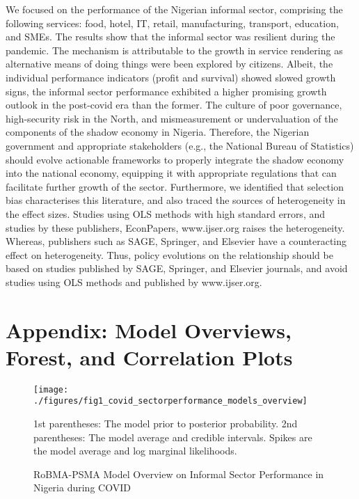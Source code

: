 \documentclass[12pt, english]{article}
\begin{document}
    We focused on the performance of the Nigerian informal sector, comprising the following services: food, hotel, IT, retail, manufacturing, transport, education, and SMEs. The results show that the informal sector was resilient during the pandemic. The mechanism is attributable to the growth in service rendering as alternative means of doing things were been explored by citizens. Albeit, the individual performance indicators (profit and survival) showed slowed growth signs, the informal sector performance exhibited a higher promising growth outlook in the post-covid era than the former. The culture of poor governance, high-security risk in the North, and mismeasurement or undervaluation of the components of the shadow economy in Nigeria. Therefore, the Nigerian government and appropriate stakeholders (e.g., the National Bureau of Statistics) should evolve actionable frameworks to properly integrate the shadow economy into the national economy, equipping it with appropriate regulations that can facilitate further growth of the sector. Furthermore, we identified that selection bias characterises this literature, and also traced the sources of heterogeneity in the effect sizes. Studies using OLS methods with high standard errors, and studies by these publishers, EconPapers, www.ijser.org raises the heterogeneity. Whereas, publishers such as SAGE, Springer, and Elsevier have a counteracting effect on heterogeneity. Thus, policy evolutions on the relationship should be based on studies published by SAGE, Springer, and Elsevier journals, and avoid studies using OLS methods and published by www.ijser.org.

    \newpage
    \printbibliography


    \section{Appendix: Model Overviews, Forest, and Correlation Plots}\label{appendixA}

    \begin{figure}[H]
        \centering
        \texttt{[image: ./figures/fig1\_covid\_sectorperformance\_models\_overview]}
        \caption{RoBMA-PSMA Model Overview on Informal Sector Performance in Nigeria during COVID}
        \label{fig14:robma-psma-model-overview-covid}
        \begin{minipage}{10cm}
            \vspace{0.1cm}
            \small 1st parentheses: The model prior to posterior probability. 2nd parentheses: The model average and credible intervals. Spikes are the model average and log marginal likelihoods.
        \end{minipage}
    \end{figure}
\end{document}
